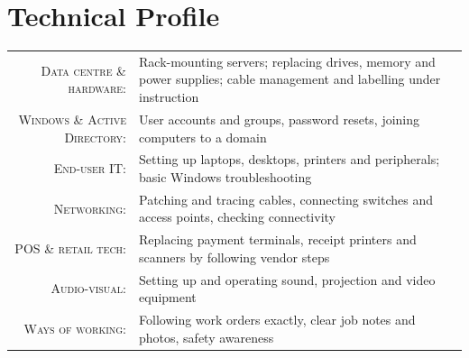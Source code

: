 \documentclass[a4paper,11pt]{article}
\begin{document}
\section{Technical Profile}
\begin{tabular}{rp{}}
  \textsc{Data centre \& hardware:}& Rack-mounting servers; replacing drives, memory and power supplies; cable management and labelling under instruction\\
  \textsc{Windows \& Active Directory:}& User accounts and groups, password resets, joining computers to a domain\\
  \textsc{End-user IT:}& Setting up laptops, desktops, printers and peripherals; basic Windows troubleshooting\\
  \textsc{Networking:}& Patching and tracing cables, connecting switches and access points, checking connectivity\\
  \textsc{POS \& retail tech:}& Replacing payment terminals, receipt printers and scanners by following vendor steps\\
  \textsc{Audio-visual:}& Setting up and operating sound, projection and video equipment\\
  \textsc{Ways of working:}& Following work orders exactly, clear job notes and photos, safety awareness\\
\end{tabular}
\end{document}

